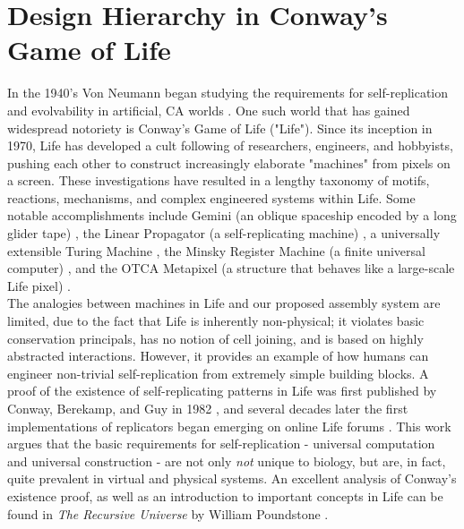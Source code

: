{%
\section{Design Hierarchy in Conway's Game of Life}\label{sec:conwayHierarchy}

In the 1940's Von Neumann began studying the requirements for self-replication and evolvability in artificial, CA worlds  \cite{Neumann1966}.  One such world that has gained widespread notoriety is Conway's Game of Life ("Life").  Since its inception in 1970, Life has developed a cult following of researchers, engineers, and hobbyists, pushing each other to construct increasingly elaborate "machines" from pixels on a screen.  These investigations have resulted in a lengthy taxonomy of motifs, reactions, mechanisms, and complex engineered systems within Life.  Some notable accomplishments include Gemini (an oblique spaceship encoded by a long glider tape) \cite{Wade2010}, the Linear Propagator (a self-replicating machine) \cite{Greene2013}, a universally extensible Turing Machine  \cite{Rendell2000}, the Minsky Register Machine (a finite universal computer) \cite{Chapman2002}, and the OTCA Metapixel (a structure that behaves like a large-scale Life pixel) \cite{Due2006}.\\

The analogies between machines in Life and our proposed assembly system are limited, due to the fact that Life is inherently non-physical; it violates basic conservation principals, has no notion of cell joining, and is based on highly abstracted interactions.  However, it provides an example of how humans can engineer non-trivial self-replication from extremely simple building blocks.  A proof of the existence of self-replicating patterns in Life was first published by Conway, Berekamp, and Guy in 1982 \cite{Berekamp1982}, and several decades later the first implementations of replicators began emerging on online Life forums \cite{Greene2013a}.  This work argues that the basic requirements for self-replication - universal computation and universal construction - are not only \textit{not} unique to biology, but are, in fact, quite prevalent in virtual and physical systems.  An excellent analysis of Conway's existence proof, as well as an introduction to important concepts in Life can be found in \textit{The Recursive Universe} by William Poundstone \cite{Poundstone1985}.\\

}
